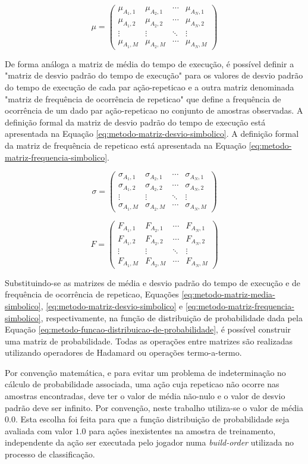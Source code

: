 \newcommand{\RogielBOMatrix}[1]{
	\ensuremath{
		\left(\begin{array}{cccc}
 			{#1}_{A_1,1} & {#1}_{A_2,1} & \cdots & {#1}_{A_N,1} \\
 			{#1}_{A_1,2} & {#1}_{A_2,2} & \cdots & {#1}_{A_N,2} \\
 			\vdots 		 & \vdots 	    & \ddots & \vdots 		\\
 			{#1}_{A_1,M} & {#1}_{A_2,M} & \cdots & {#1}_{A_N,M}
		\end{array}\right)
	}
}

\begin{equation}
	\mu = \RogielBOMatrix{\mu}
	\label{eq:metodo-matriz-media-simbolico}
\end{equation}

De forma análoga a matriz de média do tempo de execução, é possível definir a "matriz de desvio padrão do tempo de execução" para os valores de desvio padrão do tempo de execução de cada par ação-\gls{repeticao} e a outra matriz denominada "matriz de frequência de ocorrência de \gls{repeticao}" que define a frequência de ocorrência de um dado par ação-\gls{repeticao} no conjunto de amostras observadas. A definição formal da matriz de desvio padrão do tempo de execução está apresentada na Equação \ref{eq:metodo-matriz-desvio-simbolico}. A definição formal da matriz de frequência de \gls{repeticao} está apresentada na Equação \ref{eq:metodo-matriz-frequencia-simbolico}.

\begin{equation}
	\sigma = \RogielBOMatrix{\sigma}
	\label{eq:metodo-matriz-desvio-simbolico}
\end{equation}

\begin{equation}
	F = \RogielBOMatrix{F}
	\label{eq:metodo-matriz-frequencia-simbolico}
\end{equation}

Substituindo-se as matrizes de média e desvio padrão do tempo de execução e de frequência de ocorrência de \gls{repeticao}, Equações \ref{eq:metodo-matriz-media-simbolico}, \ref{eq:metodo-matriz-desvio-simbolico} e \ref{eq:metodo-matriz-frequencia-simbolico}, respectivamente, na função de distribuição de probabilidade dada pela Equação \ref{eq:metodo-funcao-distribuicao-de-probabilidade}, é possível construir uma matriz de probabilidade. Todas as operações entre matrizes são realizadas utilizando operadores de Hadamard \cite{matrix-analysis} ou operações termo-a-termo.

Por convenção matemática, e para evitar um problema de indeterminação no cálculo de probabilidade associada, uma ação cuja \gls{repeticao} não ocorre nas amostras encontradas, deve ter o valor de média não-nulo e o valor de desvio padrão deve ser infinito. Por convenção, neste trabalho utiliza-se o valor de média $0.0$. Esta escolha foi feita para que a função distribuição de probabilidade seja avaliada com valor $1.0$ para ações inexistentes na amostra de treinamento, independente da ação ser executada pelo jogador numa \textit{\gls{build-order}} utilizada no processo de classificação.

